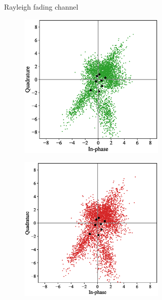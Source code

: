 \begin{figure}[tp!]
\begin{subfigure}{0.325\linewidth}
\begin{subfigure}{0.48\textwidth}
		\end{subfigure}
		\caption{Rayleigh fading channel}
		\label{fig:rayleigh_constellation}
	\end{subfigure}
	\begin{subfigure}{0.325\linewidth}
		\begin{subfigure}{0.48\textwidth}
			\includegraphics[width=\linewidth]{figs/rician_normal_constellation}
		\end{subfigure}
		\hfill
		\begin{subfigure}{0.48\textwidth}
			\includegraphics[width=\linewidth]{figs/rician_covert_constellation}

\end{subfigure}
\end{subfigure}
\end{figure}
